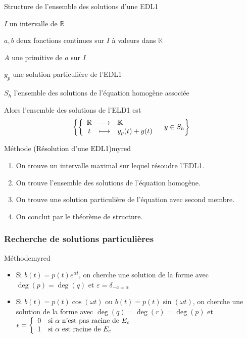    \begin{theo}{Structure de l’ensemble des solutions d’une EDL1}{}
        \begin{soient}
            \item $I$ un intervalle de $\mathbb{R}$
            \item $a,b$ deux fonctions continues sur $I$ à valeurs dans $\mathbb{K}$
            \item $A$ une primitive de $a$ sur $I$
            \item $y_{p}$ une solution particulière de l’EDL1
            \item $S_h$ l’ensemble des solutions de l’équation homogène associée
        \end{soient}
    Alors l’ensemble des solutions de l’ELD1 est 
    \[ \left\{ \application{\mathbb{R}}{\mathbb{K}}{t}{y_p(t) + y(t)} \quad y \in S_h \right\} \]
    \end{theo}

    \begin{omed}{Méthode \textcolor{black}{(Résolution d’une EDL1)}}{myred}
        \begin{enumerate}
            \item On trouve un intervalle maximal sur lequel résoudre l’EDL1.
            \item On trouve l’ensemble des solutions de l’équation homogène.
            \item On trouve une solution particulière de l’équation avec second membre.
            \item On conclut par le théorème de structure.
        \end{enumerate}
    \end{omed}

    \subsubsection{Recherche de solutions particulières}

    \begin{omed}{Méthode}{myred}
        \begin{itemize}
            \item Si \textcolor{myred}{$b(t) = p(t)e^{\alpha t}$}, on cherche une solution de la forme  avec $\deg(p) = \deg(q)$ et $\varepsilon = \delta_{-a = \alpha}$
            \item Si \textcolor{myred}{$b(t) = p(t)\cos(\omega t)$} ou \textcolor{myred}{$b(t) = p(t)\sin(\omega t)$}, on cherche une solution de la forme  avec $\deg(q) = \deg(r) = \deg(p)$ et $\epsilon = \sisi{0}{\alpha \text{ n’est pas racine de } E_c}{1}{\alpha \text{ est racine de } E_c}$
        \end{itemize}
    \end{omed}

